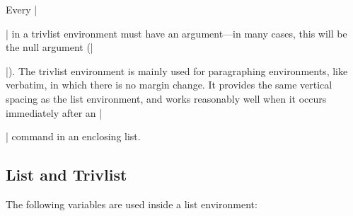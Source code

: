  Every |\item| in a trivlist environment must have an argument---in
 many cases, this will be the null argument (|\item[]|).  The trivlist
 environment is mainly used for paragraphing environments, like
 verbatim, in which there is no margin change.  It provides the same
 vertical spacing as the list environment, and works reasonably well
 when it occurs immediately after an |\item| command in an enclosing
 list.



 \subsection{List and Trivlist}

 The following variables are used inside a list environment:
